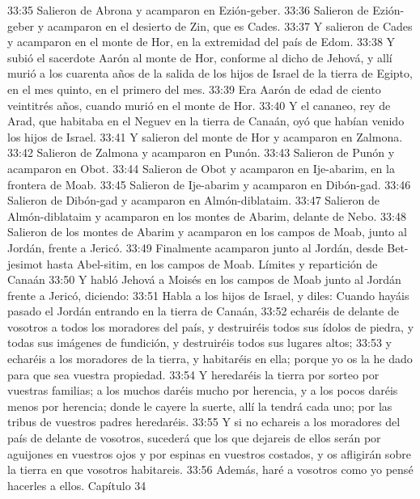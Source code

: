 33:35 Salieron de Abrona y acamparon en Ezión-geber.  
33:36 Salieron de Ezión-geber y acamparon en el desierto de Zin, que es Cades.  
33:37 Y salieron de Cades y acamparon en el monte de Hor, en la extremidad del país de Edom.  
33:38 Y subió el sacerdote Aarón al monte de Hor, conforme al dicho de Jehová, y allí murió  a los cuarenta años de la salida de los hijos de Israel de la tierra de Egipto, en el mes quinto, en el primero del mes.  
33:39 Era Aarón de edad de ciento veintitrés años, cuando murió en el monte de Hor.  
33:40 Y el cananeo, rey de Arad, que habitaba en el Neguev en la tierra de Canaán, oyó que habían venido los hijos de Israel.  
33:41 Y salieron del monte de Hor y acamparon en Zalmona.  
33:42 Salieron de Zalmona y acamparon en Punón.  
33:43 Salieron de Punón y acamparon en Obot.  
33:44 Salieron de Obot y acamparon en Ije-abarim, en la frontera de Moab.  
33:45 Salieron de Ije-abarim y acamparon en Dibón-gad.  
33:46 Salieron de Dibón-gad y acamparon en Almón-diblataim.  
33:47 Salieron de Almón-diblataim y acamparon en los montes de Abarim, delante de Nebo.  
33:48 Salieron de los montes de Abarim y acamparon en los campos de Moab, junto al Jordán, frente a Jericó.  
33:49 Finalmente acamparon junto al Jordán, desde Bet-jesimot hasta Abel-sitim, en los campos de Moab.  
Límites y repartición de Canaán  
33:50 Y habló Jehová a Moisés en los campos de Moab junto al Jordán frente a Jericó, diciendo:  
33:51 Habla a los hijos de Israel, y diles: Cuando hayáis pasado el Jordán entrando en la tierra de Canaán,  
33:52 echaréis de delante de vosotros a todos los moradores del país, y destruiréis todos sus ídolos de piedra, y todas sus imágenes de fundición, y destruiréis todos sus lugares altos;  
33:53 y echaréis a los moradores de la tierra, y habitaréis en ella; porque yo os la he dado para que sea vuestra propiedad.  
33:54 Y heredaréis la tierra por sorteo por vuestras familias; a los muchos daréis mucho por herencia, y a los pocos daréis menos por herencia; donde le cayere la suerte, allí la tendrá cada uno; por las tribus de vuestros padres heredaréis.  
33:55 Y si no echareis a los moradores del país de delante de vosotros, sucederá que los que dejareis de ellos serán por aguijones en vuestros ojos y por espinas en vuestros costados, y os afligirán sobre la tierra en que vosotros habitareis.  
33:56 Además, haré a vosotros como yo pensé hacerles a ellos.  
Capítulo 34 

